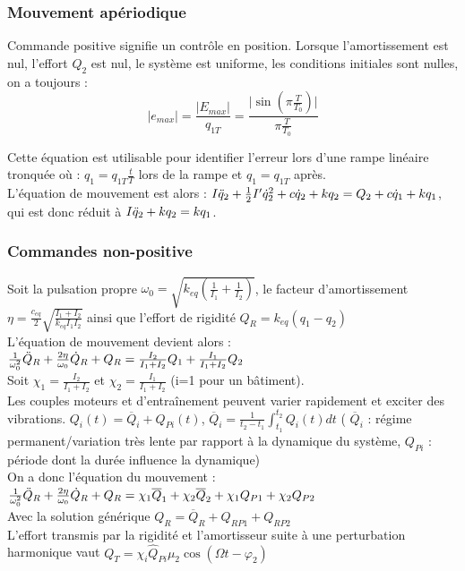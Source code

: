 \documentclass[../main.tex]{subfiles}
\begin{document}
\subsubsection{Mouvement apériodique}
Commande positive signifie un contrôle en position. Lorsque l'amortissement est nul, l'effort $Q_2$ est nul, le système est uniforme, les conditions initiales sont nulles, on a toujours : 
\begin{equation}\lvert e_{max}\rvert = \frac{\lvert E_{max} \rvert}{q_{1T}} = \frac{\lvert \sin(\pi \frac{T}{T_0}) \rvert}{\pi \frac{T}{T_0}} \end{equation}

Cette équation est utilisable pour identifier l'erreur lors d'une rampe linéaire tronquée où : $q_1 = q_{1T} \frac{t}{T}$ lors de la rampe et $q_1 = q_{1T}$ après.\\
L'équation de mouvement est alors : $I \Ddot{q}_2 + \frac{1}{2}I' \dot{q}_2^2+ c\dot{q}_2 + kq_2 = Q_2 + c\dot{q}_1 + kq_1$, qui est donc réduit à $I\Ddot{q}_2 + kq_2 = kq_1$.\\


\subsubsection{Commandes non-positive}
Soit la pulsation propre $\omega_0 = \sqrt{k_{eq} (\frac{1}{I_1} + \frac{1}{I_2})}$, le facteur d'amortissement $\eta = \frac{c_{eq}}{2} \sqrt{\frac{I_1 + I_2}{k_{eq} I_1 I_2}}$ ainsi que l'effort de rigidité $Q_R = k_{eq} (q_1-q_2)$\\

L'équation de mouvement devient alors : $\frac{1}{\omega_0^2} \Ddot{Q}_R + \frac{2 \eta}{\omega_0} \dot{Q}_R + Q_R = \frac{I_2}{I_1+I_2} Q_1 + \frac{I_1}{I_1+I_2} Q_2$\\
Soit $\chi_1 = \frac{I_2}{I_1 + I_2}$ et $\chi_2 = \frac{I_1}{I_1 + I_2}$ (i=1 pour un bâtiment).\\

Les couples moteurs et d'entraînement peuvent varier rapidement et exciter des vibrations. $Q_i(t) = \overline{Q}_i + Q_{Pi}(t)$, $\overline{Q}_i = \frac{1}{t_2-t_1} \int_{t_1}^{t_2} Q_i(t) dt$ ( $\overline{Q}_i$ : régime permanent/variation très lente par rapport à la dynamique du système, $Q_{Pi}$ : période dont la durée influence la dynamique)\\

On a donc l'équation du mouvement : $\frac{1}{\omega_0^2} \Ddot{Q}_R + \frac{2\eta}{\omega_0} \dot{Q}_R + Q_R = \chi_1 \overline{Q}_1 + \chi_2 \overline{Q}_2 + \chi_1 Q_{P1} + \chi_2 Q_{P2}$\\
Avec la solution générique $Q_R = \overline{Q}_R + Q_{RP1} + Q_{RP2}$\\
L'effort transmis par la rigidité et l'amortisseur suite à une perturbation harmonique vaut $Q_T = \chi_i \hat{Q}_{Pi} \mu_2 \cos(\Omega t - \varphi_2)$\\
\end{document}
